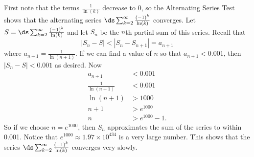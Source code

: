 \begin{activitySolution}
\item First note that the terms $\frac{1}{\ln(k)}$ decrease to $0$, so the Alternating Series Test shows that the alternating series $\ds \sum_{k=2}^{\infty} \frac{(-1)^k}{\ln(k)}$ converges. Let $S = \ds \sum_{k=2}^{\infty} \frac{(-1)^k}{\ln(k)}$ and let $S_n$ be the $n$th partial sum of this series. Recall that
\[|S_n - S| < |S_n - S_{n+1}| = a_{n+1}\]
where $a_{n+1} = \frac{1}{\ln(n+1)}$. If we can find a value of $n$ so that $a_{n+1} < 0.001$, then $|S_n - S| < 0.001$ as desired. Now
\begin{align*}
a_{n+1} &< 0.001 \\
\frac{1}{\ln(n+1)} &< 0.001 \\
\ln(n+1) &> 1000 \\
n+1 &> e^{1000} \\
n &> e^{1000}-1.
\end{align*}
So if we choose $n = e^{1000}$, then $S_n$ approximates the sum of the series to within 0.001. Notice that $e^{1000} \approx 1.97 \times 10^{434}$ is a very large number. This shows that the series $\ds \sum_{k=2}^{\infty} \frac{(-1)^k}{\ln(k)}$ converges very slowly.

\ea
\end{activitySolution}
\aftera 